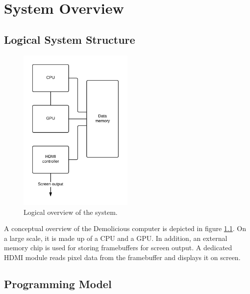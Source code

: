 \documentclass[../main/report.tex]{subfiles}
\begin{document}
\chapter{System Overview}

\section{Logical System Structure}
\begin{figure}[H]
	\centering
	\includegraphics[width=0.5\textwidth]{../system_overview/diagrams/logical_overview.png}
	\caption{Logical overview of the system.}
	\label{fig:logical_overview}
\end{figure}


A conceptual overview of the Demolicious computer is depicted in figure \ref{fig:logical_overview}.
On a large scale, it is made up of a CPU and a GPU.
In addition, an external memory chip is used for storing framebuffers for screen output.
A dedicated HDMI module reads pixel data from the framebuffer and displays it on screen.

\section{Programming Model}

\end{document}
